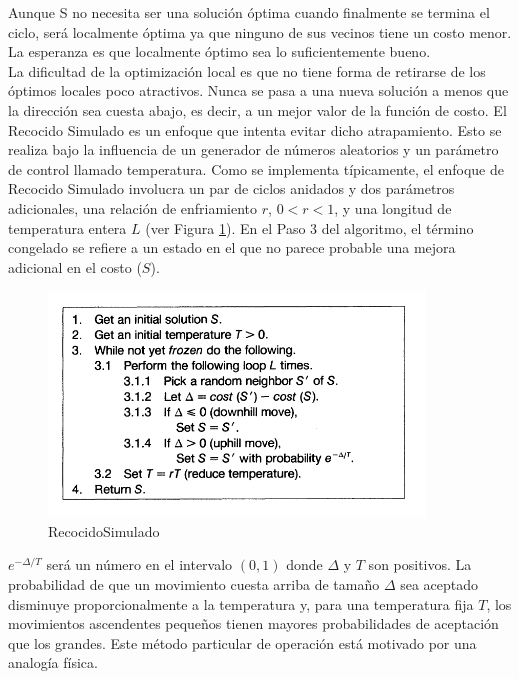 \documentclass[a4paper,openright,11pt,oneside]{book}
\begin{document}
		Aunque S no necesita ser una solución óptima cuando finalmente se termina el ciclo, será localmente óptima ya que ninguno de sus vecinos tiene un costo menor. La esperanza es que localmente óptimo sea lo suficientemente bueno. \\
		
		La dificultad de la optimización local es que no tiene forma de retirarse de los óptimos locales poco atractivos. Nunca se pasa a una nueva solución a menos que la dirección sea cuesta abajo, es decir, a un mejor valor de la función de costo. El Recocido Simulado es un enfoque que intenta evitar dicho atrapamiento. Esto se realiza bajo la influencia de un generador de números aleatorios y un parámetro de control llamado temperatura. Como se implementa típicamente, el enfoque de Recocido Simulado involucra un par de ciclos anidados y dos parámetros adicionales, una relación de enfriamiento $r$, $0 < r <1$, y una longitud de temperatura entera $L$ (ver Figura \ref{RecocidoSimulado}). En el Paso 3 del algoritmo, el término congelado se refiere a un estado en el que no parece probable una mejora adicional en el costo ($S$).
		
		\begin{figure}[h]
		\centering
		\includegraphics[width=10cm]{./Graphics/RecocidoSimulado.png} 
		\caption{RecocidoSimulado \cite{RecocidoSimulado}}
		\label{RecocidoSimulado}
		\end{figure}
		
		$e ^{-\Delta / T}$ será un número en el intervalo $(0, 1)$ donde $\Delta$ y $T$ son positivos. La probabilidad de que un movimiento cuesta arriba de tamaño $\Delta$ sea aceptado disminuye proporcionalmente a la temperatura y, para una temperatura fija $T$, los movimientos ascendentes pequeños tienen mayores probabilidades de aceptación que los grandes. Este método particular de operación está motivado por una analogía física.
		
\end{document}
